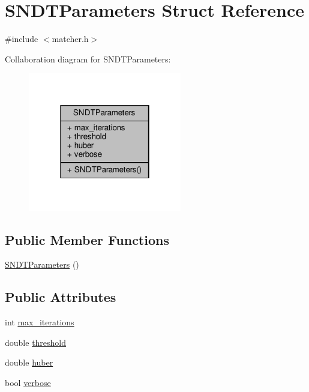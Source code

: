 \hypertarget{structSNDTParameters}{}\section{S\+N\+D\+T\+Parameters Struct Reference}
\label{structSNDTParameters}


{\ttfamily \#include $<$matcher.\+h$>$}



Collaboration diagram for S\+N\+D\+T\+Parameters\+:\nopagebreak
\begin{figure}[H]
\begin{center}
\leavevmode
\includegraphics[width=190pt]{d1/df7/structSNDTParameters__coll__graph}
\end{center}
\end{figure}
\subsection*{Public Member Functions}
\begin{DoxyCompactItemize}
\item 
\hyperlink{structSNDTParameters_a8e838a0dcf9f93394f533d14ab8eda0a}{S\+N\+D\+T\+Parameters} ()
\end{DoxyCompactItemize}
\subsection*{Public Attributes}
\begin{DoxyCompactItemize}
\item 
int \hyperlink{structSNDTParameters_a1ea1564f2e7f99ec34f3beb4108dfe8d}{max\+\_\+iterations}
\item 
double \hyperlink{structSNDTParameters_a5ce655fe4db2495af244c60a643a936f}{threshold}
\item 
double \hyperlink{structSNDTParameters_a8f73978e41a199c2c7204b61faa19bd1}{huber}
\item 
bool \hyperlink{structSNDTParameters_adadc231fb2773527b03959a2c8d39b25}{verbose}
\end{DoxyCompactItemize}


